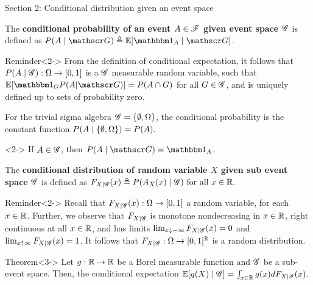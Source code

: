 \documentclass[12pt,aspectratio=169]{beamer}
\begin{document}
\begin{frame}{Section 2: Conditional distribution given an event space} 
\begin{Definition}%
The \textbf{conditional probability %
of an event $A\in\mathscr{F}$ given event space $\mathscr{G}$} is 
defined as $P(A\mid \sG) \triangleq \E[\Ind{A}\mid\sG]$. 
\end{Definition}
\begin{block}{Reminder}<2->
From the definition of conditional expectation, 
it follows that $P(A\mid \mathscr{G}):\Omega\to[0,1]$ is a $\mathscr{G}$ measurable random variable, such that 
$\E[\Ind{G}P(A|\sG)] = P(A\cap G)$ for all $G \in \mathscr{G}$, 
and is uniquely defined up to sets of probability zero. 
\end{block}
\end{frame}

\begin{frame}
\begin{Example} 
For the trivial sigma algebra   $\mathscr{G} =\left\{\emptyset ,\Omega\right\}$, 
the conditional probability is the constant function
$P(A\mid \left\{\emptyset ,\Omega\right\})=P (A).$
\end{Example}
\begin{Example}<2-> 
If $A\in \mathscr{G}$, then $P(A\mid\sG)=\Ind{A}$. 
\end{Example}
\end{frame}

\begin{frame}
\begin{Definition}%
The \textbf{conditional distribution of random variable $X$ given sub event space $\mathscr{G}$} is defined as 
$
F_{X \mid \mathscr{G}}(x)\triangleq P(A_X(x)\mid \mathscr{G})\text{ for all }x \in \mathbb{R}.
$
\end{Definition}
\begin{block}{Reminder}<2->
Recall that $F_{X\mid\mathscr{G}}(x): \Omega\to[0,1]$ a random variable, for each $x\in\mathbb{R}$. 
Further, we observe that $F_{X\mid\mathscr{G}}$ is monotone nondecreasing in $x \in \mathbb{R}$,  right continuous at all $x\in\mathbb{R}$, and has limits $\lim_{x\downarrow-\infty}F_{X\mid\mathscr{G}}(x) = 0$ and $\lim_{x\uparrow\infty}F_{X\mid\mathscr{G}}(x) = 1$. 
It follows that $F_{X\mid\mathscr{G}}: \Omega \to [0,1]^{\mathbb{R}}$ is a random distribution. 
\end{block}
\begin{block}{Theorem}<3-> 
Let $g:\mathbb{R}\to\mathbb{R}$ be a Borel measurable function and $\mathscr{G}$ be a sub-event space. 
Then, the conditional expectation $\mathbb{E}[g(X)\mid\mathscr{G}] = \int_{x\in\mathbb{R}}g(x)dF_{X\mid\mathscr{G}}(x).$
\end{block}
\end{frame}
\end{document}
